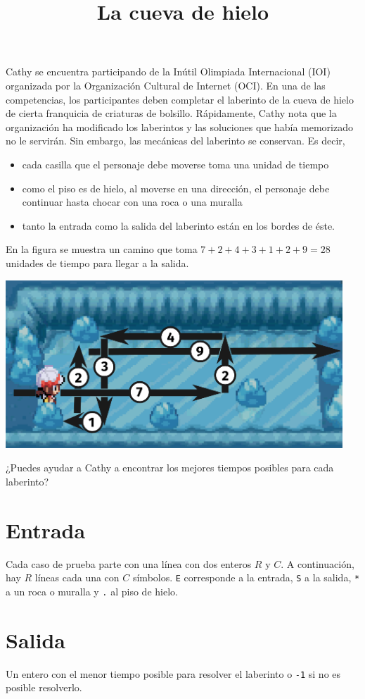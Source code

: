 \documentclass{article}
\title{La cueva de hielo}
\date{}
\begin{document}
\maketitle

Cathy se encuentra participando de la Inútil Olimpiada Internacional (IOI)
organizada por la Organización Cultural de Internet (OCI). En una de las
competencias, los participantes deben completar el laberinto de la cueva de
hielo de cierta franquicia de criaturas de bolsillo. Rápidamente, Cathy nota que
la organización ha modificado los laberintos y las soluciones que había
memorizado no le servirán. Sin embargo, las mecánicas del laberinto se
conservan. Es decir,
\begin{itemize}
	\item cada casilla que el personaje debe moverse toma una unidad de tiempo
	\item como el piso es de hielo, al moverse en una dirección, el personaje
	debe continuar hasta chocar con una roca o una muralla
	\item tanto la entrada como la salida del laberinto están en los bordes de éste.
\end{itemize}

En la figura se muestra un camino que toma $7 + 2 + 4 + 3 + 1 + 2 + 9 = 28$
unidades de tiempo para llegar a la salida.
\begin{center}
	\includegraphics[width=0.95\textwidth]{ice2.png}
\end{center}

¿Puedes ayudar a Cathy a encontrar los mejores tiempos posibles para cada
laberinto?

\section*{Entrada}
Cada caso de prueba parte con una línea con dos enteros $R$ y $C$. A
continuación, hay $R$ líneas cada una con $C$ símbolos. \texttt{E} corresponde
a la entrada, \texttt{S} a la salida, \texttt{*} a un roca o muralla y
\texttt{.} al piso de hielo.

\section*{Salida}
Un entero con el menor tiempo posible para resolver el laberinto o \texttt{-1}
si no es posible resolverlo.
\end{document}
